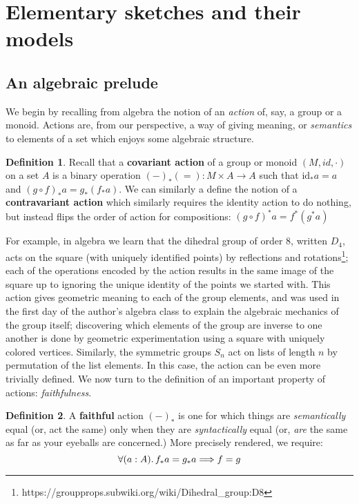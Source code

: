 \documentclass[12pt,twoside]{reedthesis}
\theoremstyle{definition}
\newtheorem{definition}{Definition}
\theoremstyle{remark}
\theoremstyle{plain}
\begin{document}
\section{Elementary sketches and their models}
\subsection{An algebraic prelude}
We begin by recalling from algebra the notion of an \emph{action} of, say, a
group or a monoid. Actions are, from our perspective, a way of giving meaning,
or \emph{semantics} to elements of a set which enjoys some algebraic structure.
\begin{definition}\label{def:covariant action}
  Recall that a \textbf{covariant action} of a group or monoid \((M, id, \cdot)\) on
  a set \(A\) is a binary operation \((-)_* (=) : M ‌\times A \rightarrow A\) such that
  \(\text{id}_* a = a\) and \( (g \circ f)_* a = g_* (f_* a) \). We can similarly a
  define the notion of a \textbf{contravariant action} which similarly requires
  the identity action to do nothing, but instead flips the order of action for
  compositions: $(g \circ f)^{*}a = f^{*}(g^{*} a)$
\end{definition}

For example, in algebra we learn that the dihedral group of order 8, written
$D_{4}$, acts on the square (with uniquely identified points) by reflections and
rotations\footnote{https://groupprops.subwiki.org/wiki/Dihedral\_group:D8}; each
of the operations encoded by the action results in the same image of the square
up to ignoring the unique identity of the points we started with. This action
gives geometric meaning to each of the group elements, and was used in the first
day of the author's algebra class to explain the algebraic mechanics of the
group itself; discovering which elements of the group are inverse to one another
is done by geometric experimentation using a square with uniquely colored
vertices. Similarly, the symmetric groups $S_{n}$ act on lists of length $n$ by
permutation of the list elements. In this case, the action can be even more
trivially defined. We now turn to the definition of an important property of
actions: \emph{faithfulness}.

\begin{definition}\label{def:faithful}
  A \textbf{faithful} action $(-)_{*}$ is one for which things are
  \emph{semantically} equal (or, act the same) only when they are
  \emph{syntactically} equal (or, \emph{are} the same as far as your eyeballs
  are concerned.) More precisely rendered, we
  require: \[ \forall (a:A)\ldotp f_* a = g_* a \Longrightarrow f = g \]
\end{definition}
\end{document}
